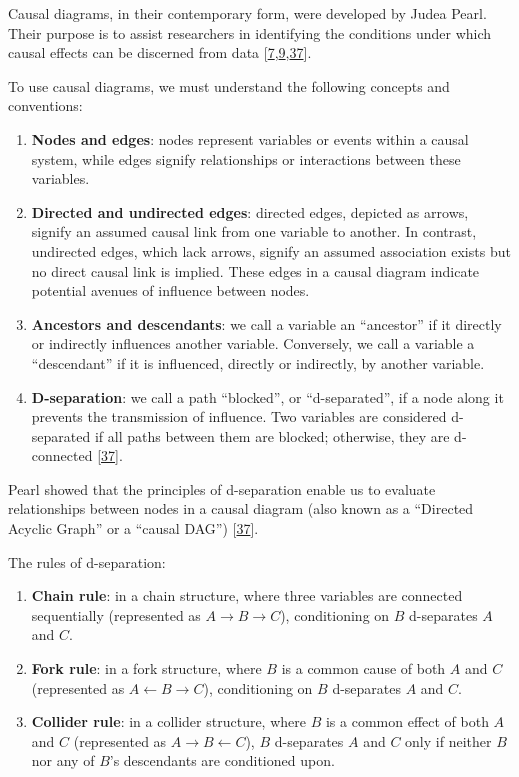 \documentclass[
  singlecolumn]{article}
\begin{document}
Causal diagrams, in their contemporary form, were developed by Judea
Pearl. Their purpose is to assist researchers in identifying the
conditions under which causal effects can be discerned from data
{[}\protect\hyperlink{ref-greenland1999}{7},\protect\hyperlink{ref-pearl2009}{9},\protect\hyperlink{ref-pearl1995}{37}{]}.

To use causal diagrams, we must understand the following concepts and
conventions:

\begin{enumerate}
\def\labelenumi{\arabic{enumi}.}
\item
  \textbf{Nodes and edges}: nodes represent variables or events within a
  causal system, while edges signify relationships or interactions
  between these variables.
\item
  \textbf{Directed and undirected edges}: directed edges, depicted as
  arrows, signify an assumed causal link from one variable to another.
  In contrast, undirected edges, which lack arrows, signify an assumed
  association exists but no direct causal link is implied. These edges
  in a causal diagram indicate potential avenues of influence between
  nodes.
\item
  \textbf{Ancestors and descendants}: we call a variable an ``ancestor''
  if it directly or indirectly influences another variable. Conversely,
  we call a variable a ``descendant'' if it is influenced, directly or
  indirectly, by another variable.
\item
  \textbf{D-separation}: we call a path ``blocked'', or ``d-separated'',
  if a node along it prevents the transmission of influence. Two
  variables are considered d-separated if all paths between them are
  blocked; otherwise, they are d-connected
  {[}\protect\hyperlink{ref-pearl1995}{37}{]}.
\end{enumerate}

Pearl showed that the principles of d-separation enable us to evaluate
relationships between nodes in a causal diagram (also known as a
``Directed Acyclic Graph'' or a ``causal DAG'')
{[}\protect\hyperlink{ref-pearl1995}{37}{]}.

The rules of d-separation:

\begin{enumerate}
\def\labelenumi{\alph{enumi}.}
\item
  \textbf{Chain rule}: in a chain structure, where three variables are
  connected sequentially (represented as
  \(A \rightarrow B \rightarrow C\)), conditioning on \(B\) d-separates
  \(A\) and \(C\).
\item
  \textbf{Fork rule}: in a fork structure, where \(B\) is a common cause
  of both \(A\) and \(C\) (represented as
  \(A \leftarrow B \rightarrow C\)), conditioning on \(B\) d-separates
  \(A\) and \(C\).
\item
  \textbf{Collider rule}: in a collider structure, where \(B\) is a
  common effect of both \(A\) and \(C\) (represented as
  \(A \rightarrow B \leftarrow C\)), \(B\) d-separates \(A\) and \(C\)
  only if neither \(B\) nor any of \(B\)'s descendants are conditioned
  upon.
\end{enumerate}
\end{document}
